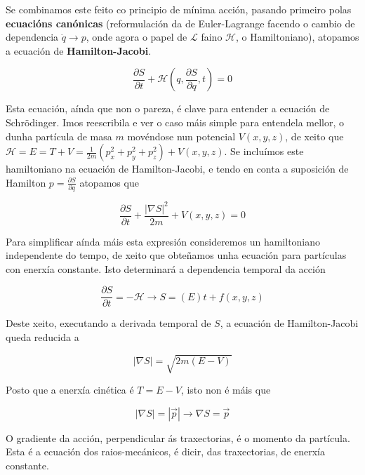 \begin{refsection}
\begin{multicols}{2}
Se combinamos este feito co principio de mínima acción, pasando primeiro polas
\textbf{ecuacións canónicas} (reformulación da de Euler-Lagrange facendo o
cambio de dependencia $\Dot{q}\rightarrow p$, onde agora o papel de
$\mathcal{L}$ faino $\mathcal{H}$, o Hamiltoniano), atopamos a ecuación de
\textbf{Hamilton-Jacobi}.

\begin{equation}
    \frac{\partial S}{\partial t} + \mathcal{H}(q,\frac{\partial S}{\partial q},t) = 0
\end{equation}

Esta ecuación, aínda que non o pareza, é clave para entender a ecuación de
Schrödinger. Imos reescribila e ver o caso máis simple para entendela mellor, o
dunha partícula de masa $m$ movéndose nun potencial $V(x,y,z)$, de xeito que
$\mathcal{H}=E=T+V=\frac{1}{2m}(p_x^2+p_y^2+p_z^2) + V(x,y,z)$. Se incluímos
este hamiltoniano na ecuación de Hamilton-Jacobi, e tendo en conta a suposición
de Hamilton $p=\frac{\partial S}{\partial q}$ atopamos que

\begin{equation}
    \frac{\partial S}{\partial t} + \frac{|\nabla S|^2}{2m} + V(x,y,z)=0
\end{equation}

Para simplificar aínda máis esta expresión consideremos un hamiltoniano
independente do tempo, de xeito que obteñamos unha ecuación para partículas con
enerxía constante. Isto determinará a dependencia temporal da acción

\begin{equation}
    \frac{\partial S}{\partial t} = -\mathcal{H} \rightarrow
    \boxed{S=(E)t + f(x,y,z)}
\end{equation}

Deste xeito, executando a derivada temporal de $S$, a ecuación de
Hamilton-Jacobi queda reducida a

\begin{equation}
    |\nabla S| = \sqrt{2m(E-V)}
\end{equation}

Posto que a enerxía cinética é $T=E-V$, isto non é máis que

\begin{equation}
    |\nabla S| =  |\vec{p}| \rightarrow \boxed{\nabla S = \vec{p}}
\end{equation}

O gradiente da acción, perpendicular ás traxectorias, é o momento da partícula.
Esta é a ecuación dos raios-mecánicos, é dicir, das traxectorias, de enerxía
constante.


\end{multicols}
\end{refsection}
